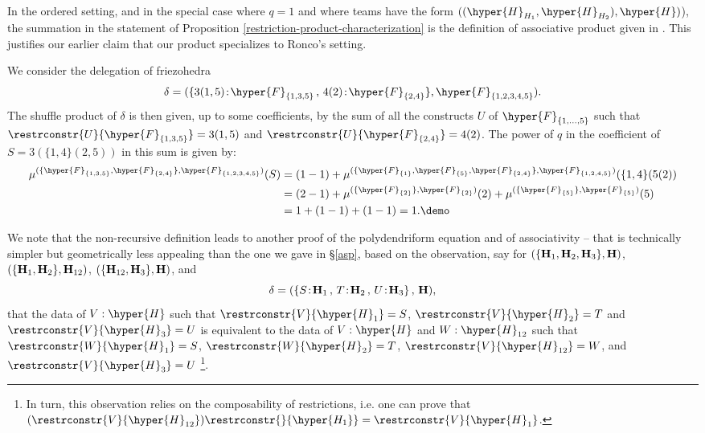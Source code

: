 \begin{remark}\label{Ronco-specialize} 
In the ordered setting, and in the special case  where $q=1$  and where teams have the form $((\hyper{H}_{H_1},\hyper{H}_{H_2}),\hyper{H})$), the summation in the statement of Proposition \ref{restriction-product-characterization}
 is  the definition of associative product given in  \cite[Theorem 3.19]{RoncoGTO}. This justifies our  earlier claim that our product specializes to Ronco's setting.
\end{remark}
\begin{example}
We consider the delegation of friezohedra $$\delta=(\{3(1,5)\!:\!\hyper{F}_{\{1,3,5\}}\,,\, 4(2)\!:\!\hyper{F}_{\{2,4\}}\},\hyper{F}_{\{1,2,3,4,5\}}).$$ The   shuffle product of $\delta$ is then given, up to some coefficients, by the sum of all the constructs $U$ of $\hyper{F}_{\{1,\ldots,5\}}$ such that  
$\restrconstr{U}{\hyper{F}_{\{1,3,5\}}} = 3(1,5)$ and $\restrconstr{U}{\hyper{F}_{\{2,4\}}} = 4(2)$. The power of $q$ in the coefficient of $S=3(\{1,4\}(2,5))$ in this sum is given by:
\begin{align*}
\mu^{(\{\hyper{F}_{\{1,3,5\}}, \hyper{F}_{\{2,4\}}\},\hyper{F}_{\{1,2,3,4,5\}})}(S)&= (1-1)+ \mu^{(\{\hyper{F}_{\{1\}}, \hyper{F}_{\{5\}}, \hyper{F}_{\{2,4\}}\},\hyper{F}_{\{1,2,4,5\}})}(\{1,4\}(5(2)) \\
   &= (2-1)+ \mu^{(\{\hyper{F}_{\{2\}}\},\hyper{F}_{\{2\}})}(2) +\mu^{(\{\hyper{F}_{\{5\}}\},\hyper{F}_{\{5\}})}(5)  \\
  &= 1+ (1-1) + (1-1)=1.  \demo
\end{align*} 

\end{example}

We note that the non-recursive definition leads to another proof of the polydendriform equation and of associativity -- that is technically  simpler but geometrically less appealing than the one we gave in \S\ref{asp}, based on the observation, say for $(\{{\bf H}_1,{\bf H}_2,{\bf H}_3\},{\bf H})$, $(\{{\bf H}_1,{\bf H}_2\},{\bf H}_{12})$,  $(\{{\bf H}_{12},{\bf H}_3\},{\bf H})$, and $$\delta=(\{S\!:\!{\bf H}_1\,,\, T\!:\!{\bf H}_2\,,\,U\!:\!{\bf H}_3\}\,,\,{\bf H}),$$
 that the data of $V:\hyper{H}$ such that $\restrconstr{V}{\hyper{H}_1}=S$, $\restrconstr{V}{\hyper{H}_2}=T$ and 
 $\restrconstr{V}{\hyper{H}_3}=U$ is equivalent to the data of $V:\hyper{H}$ and $W:\hyper{H}_{12}$ such that $\restrconstr{W}{\hyper{H}_1}=S$, $\restrconstr{W}{\hyper{H}_2}=T$, $\restrconstr{V}{\hyper{H}_{12}}=W$, and $\restrconstr{V}{\hyper{H}_3}=U$ \footnote{In turn, this observation relies on the composability of restrictions, i.e. one can prove that 
$(\restrconstr{V}{\hyper{H}_{12}})\restrconstr{{}}{\hyper{H_1}}= \restrconstr{V}{\hyper{H}_1}$.}.
 

